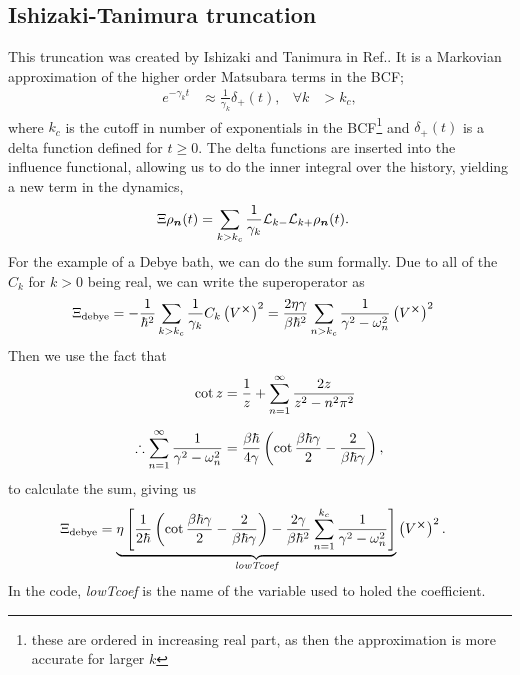 \documentclass{article}
\begin{document}
\subsection{Ishizaki-Tanimura truncation}
This truncation was created by Ishizaki and Tanimura in Ref.\cite{ishizakiQuantumDynamicsSystem2005a}.
It is a Markovian approximation of the higher order Matsubara terms in the BCF;
\begin{align}
    e^{-\gamma_k t} &\approx \frac{1}{\gamma_k}\delta_+(t), & \forall k &> k_c,
\end{align}
where $k_c$ is the cutoff in number of exponentials in the BCF\footnote{these are ordered in increasing real part, as then the approximation is more accurate for larger $k$} and $\delta_+(t)$ is a delta function defined for $t \geq 0$. The delta functions are inserted into the influence functional, allowing us to do the inner integral over the history, yielding a new term in the dynamics,
\begin{align}
    \Xi \rho_{\boldsymbol{n}}(t) &= \sum_{k>k_c} \frac{1}{\gamma_k} \mathcal{L}_{k-}\mathcal{L}_{k+} \rho_{\boldsymbol{n}}(t).
\end{align}
For the example of a Debye bath, we can do the sum formally. Due to all of the $C_k$ for $k>0$ being real, we can write the superoperator as
\begin{align}
     \Xi_{\rm debye}  &= -\frac{1}{\hbar^2}\sum_{k>k_c} \frac{1}{\gamma_k}C_k \left(V^{\cross}\right)^2= \frac{2\eta\gamma}{\beta\hbar^2}\sum_{n>k_c} \frac{1}{\gamma^2-\omega_n^2}\left(V^{\cross}\right)^2
\end{align}
Then we use the fact that
\begin{align}
    \cot z &= \frac{1}{z} + \sum_{n=1}^\infty \frac{2z}{z^2-n^2\pi^2} \nonumber \\[6pt]
    \therefore \sum_{n=1}^\infty \frac{1}{\gamma^2-\omega_n^2} &= \frac{\beta\hbar}{4\gamma}\left(\cot{\frac{\beta\hbar\gamma}{2}}-\frac{2}{\beta\hbar\gamma}\right),
\end{align}
to calculate the sum, giving us 
\begin{align}
    \Xi_{\rm debye} &=  \underbrace{\eta\left[\frac{1}{2\hbar}\left(\cot{\frac{\beta\hbar\gamma}{2}}-\frac{2}{\beta\hbar\gamma}\right)- \frac{2\gamma}{\beta\hbar^2}\sum_{n=1}^{k_c} \frac{1}{\gamma^2-\omega_n^2}\right]}_{\textit{lowTcoef}}\left(V^{\cross}\right)^2.
\end{align}
In the code, \textit{lowTcoef} is the name of the variable used to holed the coefficient.
\end{document}
